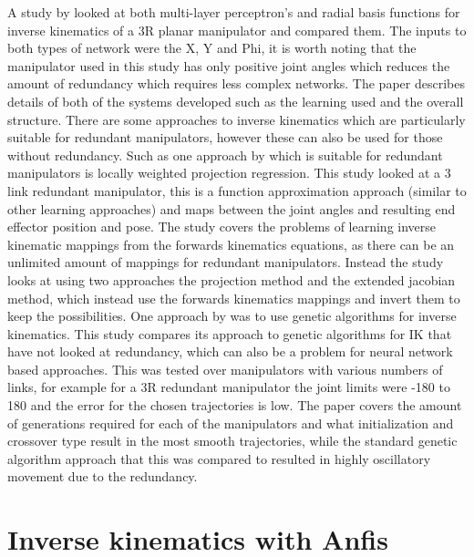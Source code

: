 \documentclass[a4paper,11pt]{article}
\begin{document}
A study by \cite{mlprbf} looked at both multi-layer perceptron's and radial basis functions for inverse kinematics of a 3R planar manipulator and compared them. The inputs to both types of network were the X, Y and Phi, it is worth noting that the manipulator used in this study has only positive joint angles which reduces the amount of redundancy which requires less complex networks. The paper describes details of both of the systems developed such as the learning used and the overall structure.
\newline
\newline
\newline
There are some approaches to inverse kinematics which are particularly suitable for redundant manipulators, however these can also be used for those without redundancy. Such as one approach by \cite{lwpr} which is suitable for redundant manipulators is locally weighted projection regression. This study looked at a 3 link redundant manipulator, this is a function approximation approach (similar to other learning approaches) and maps between the joint angles and resulting end effector position and pose. The study covers the problems of learning inverse kinematic mappings from the forwards kinematics equations, as there can be an unlimited amount of mappings for redundant manipulators. Instead the study looks at using two approaches the projection method and the extended jacobian method, which instead use the forwards kinematics mappings and invert them to keep the possibilities.
\newline
\newline
One approach by \cite{genetic1} was to use genetic algorithms for inverse kinematics. This study compares its approach to genetic algorithms for IK that have not looked at redundancy, which can also be a problem for neural network based approaches. This was tested over manipulators with various numbers of links, for example for a 3R redundant manipulator the joint limits were -180 to 180 and the error for the chosen trajectories is low. The paper covers the amount of generations required for each of the manipulators and what initialization and crossover type result in the most smooth trajectories, while the standard genetic algorithm approach that this was compared to resulted in highly oscillatory movement due to the redundancy.


\section{Inverse kinematics with Anfis}
\end{document}
